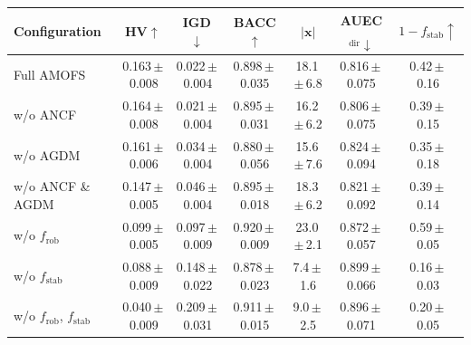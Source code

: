 \begin{tabular}{lcccccc}
\toprule
Configuration & HV$\uparrow$ & IGD$\downarrow$ & BACC$\uparrow$ & $|\mathbf{x}|$ & AUEC$_{\mathrm{dir}}\downarrow$ & $1-f_{\mathrm{stab}}\uparrow$ \\
\midrule
Full AMOFS & 0.163\,$\pm$\,0.008 & 0.022\,$\pm$\,0.004 & 0.898\,$\pm$\,0.035 & 18.1\,$\pm$\,6.8 & 0.816\,$\pm$\,0.075 & 0.42\,$\pm$\,0.16 \\
w/o ANCF & 0.164\,$\pm$\,0.008 & 0.021\,$\pm$\,0.004 & 0.895\,$\pm$\,0.031 & 16.2\,$\pm$\,6.2 & 0.806\,$\pm$\,0.075 & 0.39\,$\pm$\,0.15 \\
w/o AGDM & 0.161\,$\pm$\,0.006 & 0.034\,$\pm$\,0.004 & 0.880\,$\pm$\,0.056 & 15.6\,$\pm$\,7.6 & 0.824\,$\pm$\,0.094 & 0.35\,$\pm$\,0.18 \\
w/o ANCF \& AGDM & 0.147\,$\pm$\,0.005 & 0.046\,$\pm$\,0.004 & 0.895\,$\pm$\,0.018 & 18.3\,$\pm$\,6.2 & 0.821\,$\pm$\,0.092 & 0.39\,$\pm$\,0.14 \\
w/o $f_{\mathrm{rob}}$ & 0.099\,$\pm$\,0.005 & 0.097\,$\pm$\,0.009 & 0.920\,$\pm$\,0.009 & 23.0\,$\pm$\,2.1 & 0.872\,$\pm$\,0.057 & 0.59\,$\pm$\,0.05 \\
w/o $f_{\mathrm{stab}}$ & 0.088\,$\pm$\,0.009 & 0.148\,$\pm$\,0.022 & 0.878\,$\pm$\,0.023 & 7.4\,$\pm$\,1.6 & 0.899\,$\pm$\,0.066 & 0.16\,$\pm$\,0.03 \\
w/o $f_{\mathrm{rob}}$, $f_{\mathrm{stab}}$ & 0.040\,$\pm$\,0.009 & 0.209\,$\pm$\,0.031 & 0.911\,$\pm$\,0.015 & 9.0\,$\pm$\,2.5 & 0.896\,$\pm$\,0.071 & 0.20\,$\pm$\,0.05 \\
\bottomrule
\end{tabular}
